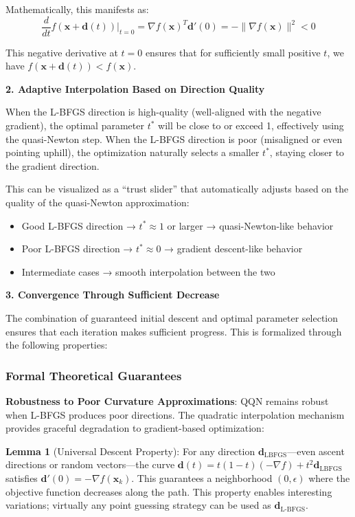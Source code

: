 Mathematically, this manifests as:
\[\frac{d}{dt}f(\mathbf{x} + \mathbf{d}(t))\bigg|_{t=0} = \nabla f(\mathbf{x})^T \mathbf{d}'(0) = -\|\nabla f(\mathbf{x})\|^2 < 0\]

This negative derivative at \(t=0\) ensures that for sufficiently small positive \(t\), we have \(f(\mathbf{x} + \mathbf{d}(t)) < f(\mathbf{x})\).

\textbf{2. Adaptive Interpolation Based on Direction Quality}

When the L-BFGS direction is high-quality (well-aligned with the negative gradient), the optimal parameter \(t^*\) will be close to or exceed 1, effectively using the quasi-Newton step. When the L-BFGS direction is poor (misaligned or even pointing uphill), the optimization naturally selects a smaller \(t^*\), staying closer to the gradient direction.

This can be visualized as a ``trust slider'' that automatically adjusts based on the quality of the quasi-Newton approximation:

\begin{itemize}
\tightlist
\item
  Good L-BFGS direction → \(t^* \approx 1\) or larger → quasi-Newton-like behavior
\item
  Poor L-BFGS direction → \(t^* \approx 0\) → gradient descent-like behavior
\item
  Intermediate cases → smooth interpolation between the two
\end{itemize}

\textbf{3. Convergence Through Sufficient Decrease}

The combination of guaranteed initial descent and optimal parameter selection ensures that each iteration makes sufficient progress. This is formalized through the following properties:

\hypertarget{formal-theoretical-guarantees}{%
\subsubsection{Formal Theoretical Guarantees}\label{formal-theoretical-guarantees}}

\textbf{Robustness to Poor Curvature Approximations}: QQN remains robust when L-BFGS produces poor directions. The quadratic interpolation mechanism provides graceful degradation to gradient-based optimization:

\textbf{Lemma 1} (Universal Descent Property): For any direction \(\mathbf{d}_{\text{LBFGS}}\)---even ascent directions or random vectors---the curve \(\mathbf{d}(t) = t(1-t)(-\nabla f) + t^2 \mathbf{d}_{\text{LBFGS}}\) satisfies \(\mathbf{d}'(0) = -\nabla f(\mathbf{x}_k)\).
This guarantees a neighborhood \((0, \epsilon)\) where the objective function decreases along the path.
This property enables interesting variations; virtually any point guessing strategy can be used as \(\mathbf{d}_{\text{L-BFGS}}\).

